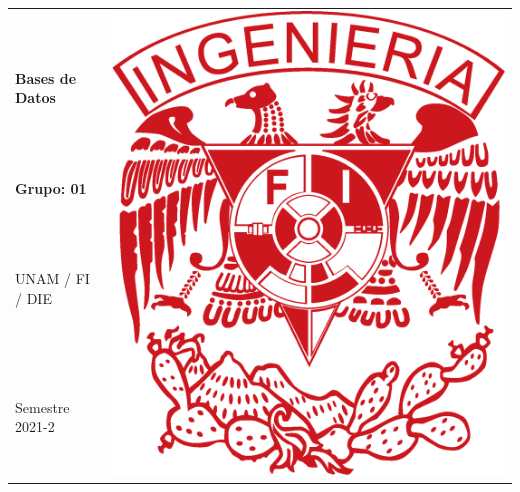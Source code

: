 \documentclass[letter,12pt]{article}
\begin{document}

\thispagestyle{empty} %

\begin{tabular} {p{14cm} p{2cm}} 		%
	&  \multirow{5}{*}{\includegraphics[scale=0.11]{UNAM_INGENIERIA}}\\ %
{\large \bf Bases de Datos} & \\ 	%
{\large \bf Grupo: 01} & \\ 			%
UNAM / FI / DIE & \\				%
Semestre 2021-2 &  \\					%
\hline 									%
\end{tabular} 							%
\end{document}
